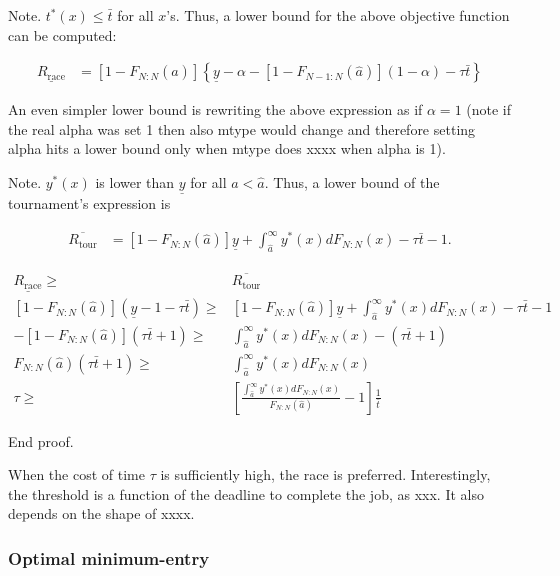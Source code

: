 \documentclass[10pt, titlepage]{article}
\newcommand\deadline{\bar{t}}
\newcommand\target{\underline{y}}
\newcommand\race{\text{race}}
\newcommand\tournament{\text{tour}}
\newcommand\mtype{\hat{a}}
\begin{document}
Note. \(t^*(x) \leq \deadline\) for all \(x\)'s. Thus, a lower bound for
the above objective function can be computed:

\begin{align}
\underline {R_\race} & = 
  [1-F_{N:N}(\mtype)] \left\{\target - \alpha -
  [1-F_{N-1:N}(\mtype)] (1 - \alpha) - \tau \deadline\right\}
\end{align}

An even simpler lower bound is rewriting the above expression as if
\(\alpha=1\) (note if the real alpha was set 1 then also mtype would
change and therefore setting alpha hits a lower bound only when mtype
does xxxx when alpha is 1).

Note. \(y^*(x)\) is lower than \(\target\) for all \(a < \mtype\). Thus,
a lower bound of the tournament's expression is

\begin{align}
\overline {R_\tournament} & = 
  [1-F_{N:N}(\mtype)] \target + \int_{\mtype}^\infty y^*(x) dF_{N:N}(x) 
  - \tau \deadline - 1. 
\end{align}

\begin{align}
  \underline {R_\race} \geq & \overline {R_\tournament} \nonumber\\
  [1-F_{N:N}(\mtype)] (\target - 1 - \tau \deadline) \geq &
  [1-F_{N:N}(\mtype)] \target + \int_{\mtype}^\infty y^*(x) dF_{N:N}(x) 
  - \tau \deadline - 1 \nonumber\\
  - [1-F_{N:N}(\mtype)] (\tau\deadline + 1) \geq &
  \int_{\mtype}^\infty y^*(x) dF_{N:N}(x) 
  - (\tau \deadline + 1) \nonumber\\
  F_{N:N}(\mtype) (\tau \deadline + 1) \geq &
  \int_{\mtype}^\infty y^*(x) dF_{N:N}(x) \nonumber\\
  \tau \geq & 
    \left[
      \frac{\int_{\mtype}^\infty y^*(x) dF_{N:N}(x)}{F_{N:N}(\mtype)} -1 
    \right] \frac{1}{\deadline}
\end{align}

End proof.

When the cost of time \(\tau\) is sufficiently high, the race is
preferred. Interestingly, the threshold is a function of the deadline to
complete the job, as xxx. It also depends on the shape of xxxx.

\subsubsection{Optimal minimum-entry}\label{optimal-minimum-entry}
\end{document}
